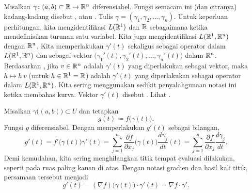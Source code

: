 Misalkan $\gamma \colon (a,b) \subset {\mathbb{R}} \to {\mathbb{R}}^n$ diferensiabel.
Fungsi semacam ini (dan citranya) kadang-kadang disebut \emph{},
atau \emph{}.
Tulis $\gamma =
(\gamma_1,\gamma_2,\ldots,\gamma_n)$.
Untuk keperluan perhitungan,
kita mengidentifikasi $L({\mathbb{R}}^1)$ dan ${\mathbb{R}}$ sebagaimana ketika mendefinisikan
turunan satu variabel.
Kita juga mengidentifikasi $L({\mathbb{R}}^1,{\mathbb{R}}^n)$ dengan ${\mathbb{R}}^n$.
Kita memperlakukan $\gamma'(t)$ sekaligus sebagai operator dalam
$L({\mathbb{R}}^1,{\mathbb{R}}^n)$ dan sebagai vektor
$\bigl(\gamma_1'(t),\gamma_2'(t),\ldots,\gamma_n'(t)\bigr)$
dalam ${\mathbb{R}}^n$.
Berdasarkan ,
jika $v\in {\mathbb{R}}^n$ adalah $\gamma'(t)$ yang diperlakukan sebagai vektor,
maka $h \mapsto h \, v$ (untuk $h \in {\mathbb{R}}^1 = {\mathbb{R}}$) adalah
$\gamma'(t)$ yang diperlakukan sebagai operator
dalam $L({\mathbb{R}}^1,{\mathbb{R}}^n)$.
Kita sering menggunakan sedikit
penyalahgunaan notasi ini ketika membahas kurva.
Vektor $\gamma'(t)$ disebut \emph{}.
Lihat .
\begin{myfigureht}
\caption{Kurva diferensiabel dan turunannya sebagai
vektor (agar jelas, diasumsikan $\gamma$ terdefinisi pada $[a,b]$).
Vektor singgung $\gamma'(t)$ menunjuk sepanjang kurva.\label{fig:difcurveder}}
\end{myfigureht}

Misalkan $\gamma\bigl((a,b)\bigr) \subset U$ dan tetapkan
\begin{equation*}
g(t) \coloneqq f\bigl(\gamma(t)\bigr) .
\end{equation*}
Fungsi
$g$ diferensiabel. Dengan memperlakukan $g'(t)$ sebagai bilangan,
\begin{equation*}
g'(t) =
f'\bigl(\gamma(t)\bigr) \gamma'(t)
=
\sum_{j=1}^n
\frac{\partial f}{\partial x_j} \bigl(\gamma(t)\bigr)
\frac{d\gamma_j}{dt} (t)
=
\sum_{j=1}^n
\frac{\partial f}{\partial x_j}
\frac{d\gamma_j}{dt} .
\end{equation*}
Demi kemudahan,
kita sering
menghilangkan titik tempat evaluasi dilakukan,
seperti pada ruas paling kanan di atas.
Dengan notasi gradien dan hasil kali titik,
persamaan tersebut menjadi
\begin{equation*}
g'(t) = (\nabla f) \bigl(\gamma(t)\bigr) \cdot \gamma'(t)
= \nabla f \cdot \gamma'.
\end{equation*}

